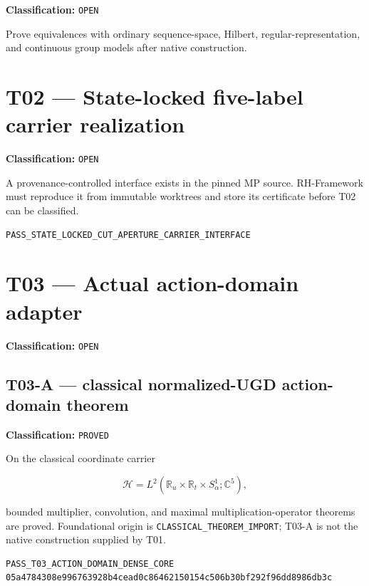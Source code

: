 \textbf{Classification:} \texttt{OPEN}

Prove equivalences with ordinary sequence-space, Hilbert,
regular-representation, and continuous group models after native construction.

\hypertarget{t02-state-locked-five-label-carrier-realization}{%
\section{T02 --- State-locked five-label carrier realization}\label{t02-state-locked-five-label-carrier-realization}}

\textbf{Classification:} \texttt{OPEN}

A provenance-controlled interface exists in the pinned MP source. RH-Framework
must reproduce it from immutable worktrees and store its certificate before T02
can be classified.

\begin{verbatim}
PASS_STATE_LOCKED_CUT_APERTURE_CARRIER_INTERFACE
\end{verbatim}

\hypertarget{t03-actual-action-domain-adapter}{%
\section{T03 --- Actual action-domain adapter}\label{t03-actual-action-domain-adapter}}

\textbf{Classification:} \texttt{OPEN}

\hypertarget{t03-a-classical-normalized-ugd-action-domain-theorem}{%
\subsection{T03-A --- classical normalized-UGD action-domain theorem}\label{t03-a-classical-normalized-ugd-action-domain-theorem}}

\textbf{Classification:} \texttt{PROVED}

On the classical coordinate carrier

\[
\mathcal H=L^2(\mathbb R_u\times\mathbb R_t\times S^1_\alpha;\mathbb C^5),
\]

bounded multiplier, convolution, and maximal multiplication-operator theorems
are proved. Foundational origin is \texttt{CLASSICAL\_THEOREM\_IMPORT}; T03-A is not the
native construction supplied by T01.

\begin{verbatim}
PASS_T03_ACTION_DOMAIN_DENSE_CORE
05a4784308e996763928b4cead0c86462150154c506b30bf292f96dd8986db3c
\end{verbatim}

